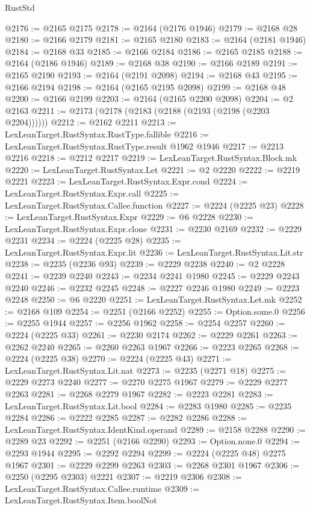 \begin{lexlean}{RustStd}
\begin{coremodule}
@2176 := @2165 @2175
@2178 := @2164 (@2176 @1946)
@2179 := @2168 @28
@2180 := @2166 @2179
@2181 := @2165 @2180
@2183 := @2164 (@2181 @1946)
@2184 := @2168 @33
@2185 := @2166 @2184
@2186 := @2165 @2185
@2188 := @2164 (@2186 @1946)
@2189 := @2168 @38
@2190 := @2166 @2189
@2191 := @2165 @2190
@2193 := @2164 (@2191 @2098)
@2194 := @2168 @43
@2195 := @2166 @2194
@2198 := @2164 (@2165 @2195 @2098)
@2199 := @2168 @48
@2200 := @2166 @2199
@2203 := @2164 (@2165 @2200 @2098)
@2204 := @2 @2163
@2211 := @2173 (@2178 (@2183 (@2188 (@2193 (@2198 (@2203 @2204))))))
@2212 := @2162 @2211
@2213 := LexLeanTarget.RustSyntax.RustType.fallible
@2216 := LexLeanTarget.RustSyntax.RustType.result @1962 @1946
@2217 := @2213 @2216
@2218 := @2212 @2217
@2219 := LexLeanTarget.RustSyntax.Block.mk
@2220 := LexLeanTarget.RustSyntax.Let
@2221 := @2 @2220
@2222 := @2219 @2221
@2223 := LexLeanTarget.RustSyntax.Expr.cond
@2224 := LexLeanTarget.RustSyntax.Expr.call
@2225 := LexLeanTarget.RustSyntax.Callee.function
@2227 := @2224 (@2225 @23)
@2228 := LexLeanTarget.RustSyntax.Expr
@2229 := @6 @2228
@2230 := LexLeanTarget.RustSyntax.Expr.clone
@2231 := @2230 @2169
@2232 := @2229 @2231
@2234 := @2224 (@2225 @28)
@2235 := LexLeanTarget.RustSyntax.Expr.lit
@2236 := LexLeanTarget.RustSyntax.Lit.str
@2238 := @2235 (@2236 @93)
@2239 := @2229 @2238
@2240 := @2 @2228
@2241 := @2239 @2240
@2243 := @2234 @2241 @1980
@2245 := @2229 @2243 @2240
@2246 := @2232 @2245
@2248 := @2227 @2246 @1980
@2249 := @2223 @2248
@2250 := @6 @2220
@2251 := LexLeanTarget.RustSyntax.Let.mk
@2252 := @2168 @109
@2254 := @2251 (@2166 @2252)
@2255 := Option.some.{0}
@2256 := @2255 @1944
@2257 := @2256 @1962
@2258 := @2254 @2257
@2260 := @2224 (@2225 @33)
@2261 := @2230 @2174
@2262 := @2229 @2261
@2263 := @2262 @2240
@2265 := @2260 @2263 @1967
@2266 := @2223 @2265
@2268 := @2224 (@2225 @38)
@2270 := @2224 (@2225 @43)
@2271 := LexLeanTarget.RustSyntax.Lit.nat
@2273 := @2235 (@2271 @18)
@2275 := @2229 @2273 @2240
@2277 := @2270 @2275 @1967
@2279 := @2229 @2277 @2263
@2281 := @2268 @2279 @1967
@2282 := @2223 @2281
@2283 := LexLeanTarget.RustSyntax.Lit.bool
@2284 := @2283 @1980
@2285 := @2235 @2284
@2286 := @2222 @2285
@2287 := @2282 @2286
@2288 := LexLeanTarget.RustSyntax.IdentKind.operand
@2289 := @2158 @2288
@2290 := @2289 @23
@2292 := @2251 (@2166 @2290)
@2293 := Option.none.{0}
@2294 := @2293 @1944
@2295 := @2292 @2294
@2299 := @2224 (@2225 @48) @2275 @1967
@2301 := @2229 @2299 @2263
@2303 := @2268 @2301 @1967
@2306 := @2250 (@2295 @2303) @2221
@2307 := @2219 @2306
@2308 := LexLeanTarget.RustSyntax.Callee.runtime
@2309 := LexLeanTarget.RustSyntax.Item.boolNot

\end{coremodule}
\end{lexlean}
